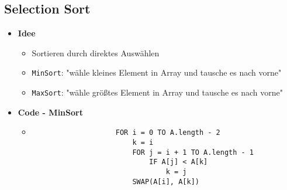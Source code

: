 \pagebreak

\subsection{Selection Sort}
    \begin{itemize}
        \item \textbf{Idee}
            \begin{itemize}
                \item Sortieren durch direktes Auswählen
                \item \texttt{MinSort}: "wähle kleines Element in Array und tausche es nach vorne" 
                \item \texttt{MaxSort}: "wähle größtes Element in Array und tausche es nach vorne" 
            \end{itemize}

        \item \textbf{Code - MinSort}
            \begin{itemize}
                \item[]
                    \begin{verbatim}
                    FOR i = 0 TO A.length - 2
                        k = i 
                        FOR j = i + 1 TO A.length - 1
                            IF A[j] < A[k]
                                k = j 
                        SWAP(A[i], A[k])
                    \end{verbatim}
            \end{itemize}
    \end{itemize}


